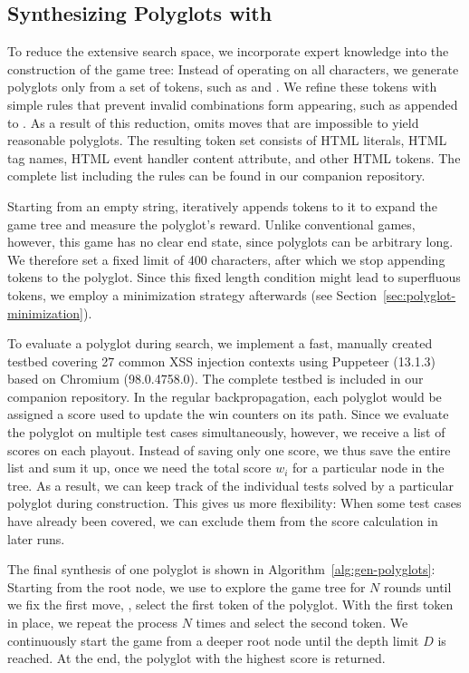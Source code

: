 \subsection{Synthesizing Polyglots with \mcts{}}%
\label{sec:synthesizing-with-mcts}


To reduce the extensive search space, we incorporate expert knowledge into the construction of the game tree:
Instead of operating on all characters, we generate polyglots only from a set of tokens, such as \code{<} and . We refine these tokens with simple rules that prevent invalid combinations form appearing, such as  appended to .
As a result of this reduction, \mcts{} omits moves that are impossible to yield reasonable polyglots.
The resulting token set consists of HTML literals, HTML tag names, HTML event handler content attribute, and other HTML tokens.
The complete list including the rules can be found in our companion repository. %



Starting from an empty string, \mcts{} iteratively appends tokens to it to expand the game tree and measure the polyglot's reward.
Unlike conventional games, however, this game has no clear end state, since polyglots can be arbitrary long.
We therefore set a fixed limit of 400 characters, after which we stop appending tokens to the polyglot.
Since this fixed length condition might lead to superfluous tokens, we employ a minimization strategy afterwards (see Section~\ref{sec:polyglot-minimization}).

To evaluate a polyglot during search, we implement a fast, manually created testbed covering \num{27} common XSS injection contexts using Puppeteer (13.1.3) based on Chromium (98.0.4758.0).
The complete testbed is included in our companion repository.
In the regular \mcts{} backpropagation, each polyglot would be assigned a score used to update the win counters on its path. Since we evaluate the polyglot on multiple test cases simultaneously, however, we receive a list of scores on each playout. Instead of saving only one score, we thus save the entire list and sum it up, once we need the total score $w_i$ for a particular node in the tree. As a result, we can keep track of the individual tests solved by a particular polyglot during construction.
This gives us more flexibility: When some test cases have already been covered, we can exclude them from the score calculation in later runs. %

The final synthesis of one polyglot is shown in Algorithm~\ref{alg:gen-polyglots}:
Starting from the root node, we use \mcts{} to explore the game tree for $N$ rounds until we fix the first move, \ie, select the first token of the polyglot.
With the first token in place, we repeat the process $N$ times and select the second token.
We continuously start the game from a deeper root node until the depth limit $D$ is reached.
At the end, the polyglot with the highest score is returned.

